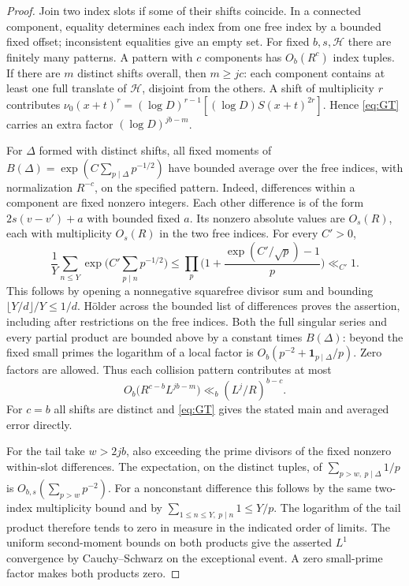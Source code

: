 \documentclass[11pt]{article}
\newcommand{\one}{\mathbf 1}
\begin{document}
\begin{proof}
Join two index slots if some of their shifts coincide. In a connected
component, equality determines each index from one free index by a
bounded fixed offset; inconsistent equalities give an empty set.
For fixed \(b,s,\mathcal H\) there are finitely many patterns. A pattern
with \(c\) components has \(O_b(R^c)\) index tuples. If there are \(m\)
distinct shifts overall, then \(m\ge jc\): each component contains at
least one full translate of \(\mathcal H\), disjoint from the others.
A shift of multiplicity \(r\) contributes
\(\nu_0(x+t)^r=(\log D)^{r-1}[(\log D)S(x+t)^{2r}]\).
Hence \eqref{eq:GT} carries an extra factor \((\log D)^{jb-m}\).

For \(\Delta\) formed with distinct shifts, all fixed moments of
\(B(\Delta)=\exp(C\sum_{p\mid\Delta}p^{-1/2})\) have bounded average
over the free indices, with normalization \(R^{-c}\), on the specified
pattern. Indeed, differences within a component are fixed nonzero
integers. Each other difference is of the form \(2s(v-v')+a\) with
bounded fixed \(a\). Its nonzero absolute values are \(O_s(R)\), each with
multiplicity \(O_s(R)\) in the two free indices. For every \(C'>0\),
\begin{equation}\label{eq:euler}
 \frac1Y\sum_{n\le Y}\exp\!\Big(C'\sum_{p\mid n}p^{-1/2}\Big)
 \le\prod_p\Big(1+\frac{\exp(C'/\sqrt p)-1}{p}\Big)\ll_{C'}1.
\end{equation}
This follows by opening a nonnegative squarefree divisor sum and bounding
\(\lfloor Y/d\rfloor/Y\le1/d\). H\"older across the bounded list of
differences proves the assertion, including after restrictions on the free
indices. Both the full singular series and every partial product are bounded
above by a constant times \(B(\Delta)\): beyond the fixed small primes the
logarithm of a local factor is \(O_b(p^{-2}+\one_{p\mid\Delta}/p)\).
Zero factors are allowed. Thus each collision pattern contributes at most
\[
  O_b\big(R^{c-b}L^{jb-m}\big)
       \ll_b (L^j/R)^{b-c}.
\]
For \(c=b\) all shifts are distinct and \eqref{eq:GT} gives the stated
main and averaged error directly.

For the tail take \(w>2jb\), also exceeding the prime divisors of the
fixed nonzero within-slot differences. The expectation, on the distinct
tuples, of \(\sum_{p>w,\ p\mid\Delta}1/p\) is
\(O_{b,s}(\sum_{p>w}p^{-2})\). For a nonconstant difference this follows
by the same two-index multiplicity bound and by
\(\sum_{1\le n\le Y,\ p\mid n}1\le Y/p\).
The logarithm of the tail product therefore tends to zero in measure in
the indicated order of limits. The uniform second-moment bounds on both
products give the asserted \(L^1\) convergence by Cauchy--Schwarz on the
exceptional event. A zero small-prime factor makes both products zero.
\end{proof}
\end{document}
